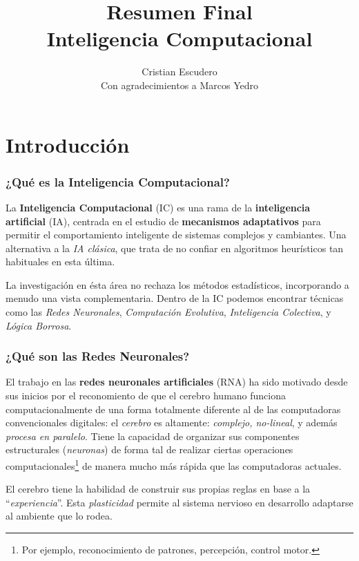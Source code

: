 \documentclass[10pt,a4paper]{article}
\author{Cristian Escudero\\\small{Con agradecimientos a Marcos Yedro}}
\title{Resumen Final\\Inteligencia Computacional}
\begin{document}
\maketitle

\pagebreak

\tableofcontents

\pagebreak

\part{Introducción}
\setcounter{section}{0}

\section{¿Qué es la Inteligencia Computacional?}

La \textbf{Inteligencia Computacional} (IC) es una rama de la \textbf{inteligencia artificial} (IA), centrada en el estudio de \textbf{mecanismos adaptativos} para permitir el comportamiento inteligente de sistemas complejos y cambiantes. Una alternativa a la \textit{IA clásica}, que trata de no confiar en algoritmos heurísticos tan habituales en esta última.

La investigación en ésta área no rechaza los métodos estadísticos, incorporando a menudo una vista complementaria. Dentro de la IC podemos encontrar técnicas como las \textit{Redes Neuronales}, \textit{Computación Evolutiva}, \textit{Inteligencia Colectiva}, y \textit{Lógica Borrosa}.

\section{¿Qué son las Redes Neuronales?}

El trabajo en las \textbf{redes neuronales artificiales} (RNA) ha sido motivado desde sus inicios por el reconomiento de que el cerebro humano funciona computacionalmente de una forma totalmente diferente al de las computadoras convencionales digitales: el \textit{cerebro} es altamente: \textit{complejo, no-lineal}, y además \textit{procesa en paralelo}. Tiene la capacidad de organizar sus componentes estructurales (\textit{neuronas}) de forma tal de realizar ciertas operaciones computacionales\footnote{Por ejemplo, reconocimiento de patrones, percepción, control motor.} de manera mucho más rápida que las computadoras actuales.

El cerebro tiene la habilidad de construir sus propias reglas en base a la ``\textit{experiencia}''. Esta \textit{plasticidad} permite al sistema nervioso en desarrollo adaptarse al ambiente que lo rodea.
\end{document}
